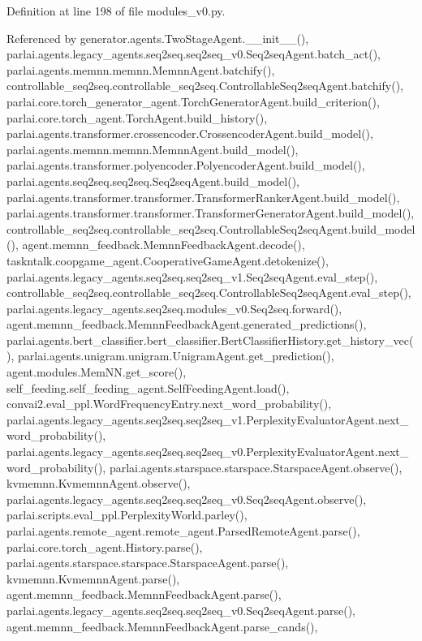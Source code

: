 Definition at line 198 of file modules\+\_\+v0.\+py.



Referenced by generator.\+agents.\+Two\+Stage\+Agent.\+\_\+\+\_\+init\+\_\+\+\_\+(), parlai.\+agents.\+legacy\+\_\+agents.\+seq2seq.\+seq2seq\+\_\+v0.\+Seq2seq\+Agent.\+batch\+\_\+act(), parlai.\+agents.\+memnn.\+memnn.\+Memnn\+Agent.\+batchify(), controllable\+\_\+seq2seq.\+controllable\+\_\+seq2seq.\+Controllable\+Seq2seq\+Agent.\+batchify(), parlai.\+core.\+torch\+\_\+generator\+\_\+agent.\+Torch\+Generator\+Agent.\+build\+\_\+criterion(), parlai.\+core.\+torch\+\_\+agent.\+Torch\+Agent.\+build\+\_\+history(), parlai.\+agents.\+transformer.\+crossencoder.\+Crossencoder\+Agent.\+build\+\_\+model(), parlai.\+agents.\+memnn.\+memnn.\+Memnn\+Agent.\+build\+\_\+model(), parlai.\+agents.\+transformer.\+polyencoder.\+Polyencoder\+Agent.\+build\+\_\+model(), parlai.\+agents.\+seq2seq.\+seq2seq.\+Seq2seq\+Agent.\+build\+\_\+model(), parlai.\+agents.\+transformer.\+transformer.\+Transformer\+Ranker\+Agent.\+build\+\_\+model(), parlai.\+agents.\+transformer.\+transformer.\+Transformer\+Generator\+Agent.\+build\+\_\+model(), controllable\+\_\+seq2seq.\+controllable\+\_\+seq2seq.\+Controllable\+Seq2seq\+Agent.\+build\+\_\+model(), agent.\+memnn\+\_\+feedback.\+Memnn\+Feedback\+Agent.\+decode(), taskntalk.\+coopgame\+\_\+agent.\+Cooperative\+Game\+Agent.\+detokenize(), parlai.\+agents.\+legacy\+\_\+agents.\+seq2seq.\+seq2seq\+\_\+v1.\+Seq2seq\+Agent.\+eval\+\_\+step(), controllable\+\_\+seq2seq.\+controllable\+\_\+seq2seq.\+Controllable\+Seq2seq\+Agent.\+eval\+\_\+step(), parlai.\+agents.\+legacy\+\_\+agents.\+seq2seq.\+modules\+\_\+v0.\+Seq2seq.\+forward(), agent.\+memnn\+\_\+feedback.\+Memnn\+Feedback\+Agent.\+generated\+\_\+predictions(), parlai.\+agents.\+bert\+\_\+classifier.\+bert\+\_\+classifier.\+Bert\+Classifier\+History.\+get\+\_\+history\+\_\+vec(), parlai.\+agents.\+unigram.\+unigram.\+Unigram\+Agent.\+get\+\_\+prediction(), agent.\+modules.\+Mem\+N\+N.\+get\+\_\+score(), self\+\_\+feeding.\+self\+\_\+feeding\+\_\+agent.\+Self\+Feeding\+Agent.\+load(), convai2.\+eval\+\_\+ppl.\+Word\+Frequency\+Entry.\+next\+\_\+word\+\_\+probability(), parlai.\+agents.\+legacy\+\_\+agents.\+seq2seq.\+seq2seq\+\_\+v1.\+Perplexity\+Evaluator\+Agent.\+next\+\_\+word\+\_\+probability(), parlai.\+agents.\+legacy\+\_\+agents.\+seq2seq.\+seq2seq\+\_\+v0.\+Perplexity\+Evaluator\+Agent.\+next\+\_\+word\+\_\+probability(), parlai.\+agents.\+starspace.\+starspace.\+Starspace\+Agent.\+observe(), kvmemnn.\+Kvmemnn\+Agent.\+observe(), parlai.\+agents.\+legacy\+\_\+agents.\+seq2seq.\+seq2seq\+\_\+v0.\+Seq2seq\+Agent.\+observe(), parlai.\+scripts.\+eval\+\_\+ppl.\+Perplexity\+World.\+parley(), parlai.\+agents.\+remote\+\_\+agent.\+remote\+\_\+agent.\+Parsed\+Remote\+Agent.\+parse(), parlai.\+core.\+torch\+\_\+agent.\+History.\+parse(), parlai.\+agents.\+starspace.\+starspace.\+Starspace\+Agent.\+parse(), kvmemnn.\+Kvmemnn\+Agent.\+parse(), agent.\+memnn\+\_\+feedback.\+Memnn\+Feedback\+Agent.\+parse(), parlai.\+agents.\+legacy\+\_\+agents.\+seq2seq.\+seq2seq\+\_\+v0.\+Seq2seq\+Agent.\+parse(), agent.\+memnn\+\_\+feedback.\+Memnn\+Feedback\+Agent.\+parse\+\_\+cands(), 